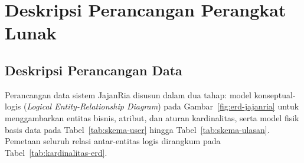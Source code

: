 \clearpage
\section{Deskripsi Perancangan Perangkat Lunak}

\subsection{Deskripsi Perancangan Data}

Perancangan data sistem JajanRia disusun dalam dua tahap: model konseptual-logis (\textit{Logical Entity-Relationship Diagram}) pada Gambar~\ref{fig:erd-jajanria} untuk menggambarkan entitas bisnis, atribut, dan aturan kardinalitas, serta model fisik basis data pada Tabel~\ref{tab:skema-user} hingga Tabel~\ref{tab:skema-ulasan}. Pemetaan seluruh relasi antar-entitas logis dirangkum pada Tabel~\ref{tab:kardinalitas-erd}.

